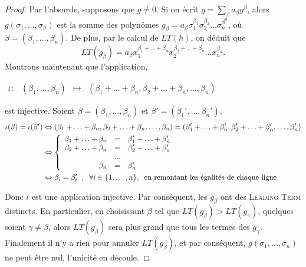 \documentclass[12pt]{article}
\theoremstyle{remark}\newtheorem{note}{Note}
\theoremstyle{remark}\newtheorem{nota}{Notation}
\theoremstyle{definition}
\begin{document}
\begin{proof}
Par l'absurde, supposons que $g \neq 0$. Si on écrit $g = \sum_{\beta} a_{\beta}y^{\beta}$, alors $g(\sigma_1, \ldots , \sigma_n)$ est la somme des polynômes $g_\beta = a_\beta \sigma_1^{\beta_1} \sigma_2^{\beta_2} \ldots \sigma_n^{\beta^n}$, où $\beta = (\beta_1 , \ldots , \beta_n)$. De plus, par le calcul de $LT(h)$, on déduit que $$LT(g_\beta) = a_\beta x_1^{\beta_1 + \ldots + \beta_n} x_2^{\beta_2 + \ldots + \beta_n} \ldots x_n^{\beta_n}.$$
Montrons maintenant que l'application,
\begin{center}
$
\begin{array}{l|rcl}
\iota :
    & (\beta_1 , \ldots , \beta_n) & \longmapsto & (\beta_1 + \ldots + \beta_n , \beta_2 + \ldots + \beta_n , \ldots , \beta_n) \end{array}
$
\end{center} est injective. Soient $\beta = (\beta_1 , \ldots , \beta_n)$ et $\beta ' = (\beta_1 ', \ldots , \beta_n ')$,
\begin{align*}
\iota (\beta) = \iota (\beta ') &\Leftrightarrow (\beta_1 + \ldots + \beta_n , \beta_2 + \ldots + \beta_n , \ldots , \beta_n) = (\beta_1 ' + \ldots + \beta_n ' , \beta_2 ' + \ldots + \beta_n ' , \ldots , \beta_n ')\\
&\Leftrightarrow \left \{
\begin{array}{rcl}
\beta_1 + \ldots + \beta_n  &=& \beta_1 ' + \ldots + \beta_n ' \\
\beta_2 + \ldots + \beta_n  &=& \beta_2 ' + \ldots + \beta_n ' \\
&...&\\
\beta_n &=& \beta_n '
\end{array}
\right.\\
&\Leftrightarrow \beta_i = \beta_i' \hspace{0,2cm} , \hspace{0,2cm} \forall i \in \{ 1,  \ldots , n \} , \hspace{0,2cm} \text{en remontant les égalités de chaque ligne}
\end{align*}

Donc $\iota$ est une application injective. Par conséquent, les $g_\beta$ ont des \textsc{Leading Term} distincts. En particulier, en choisissant $\beta$ tel que $LT(g_\beta)>LT(g_\gamma)$, quelques soient $\gamma \neq \beta$, alors $LT(g_\beta)$ sera plus grand que tous les termes des $g_\gamma$. Finalement il n'y a rien pour annuler $LT(g_\beta)$, et par conséquent, $g(\sigma_1 , \ldots , \sigma_n)$ ne peut être nul, l'unicité en découle.
\end{proof}
\end{document}
